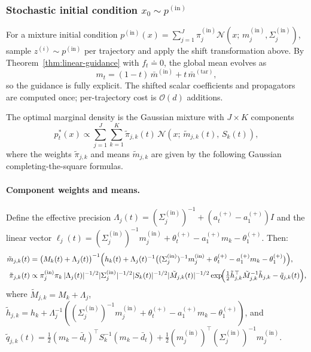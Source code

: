 \documentclass[11pt,onecolumn]{article}
\newcommand{\calN}{\mathcal{N}}
\newcommand{\pin}{p^{(\mathrm{in})}}
\begin{document}
\subsubsection{Stochastic initial condition $x_0\sim\pin$}
For a mixture initial condition
$\pin(x)=\sum_{j=1}^J\pi_j^{(\mathrm{in})}\calN(x;\,m_j^{(\mathrm{in})},\Sigma_j^{(\mathrm{in})})$,
sample $z^{(i)}\sim\pin$ per trajectory and apply the shift
transformation above.
By Theorem~\ref{thm:linear-guidance} with $f_t\doteq 0$, the global
mean evolves as
\begin{equation}
  m_t = (1-t)\,\bar m^{(\mathrm{in})} + t\,\bar m^{(\mathrm{tar})},
  \label{SI:eq:mt-gm-explicit}
\end{equation}
so the guidance is fully explicit.
The shifted scalar coefficients and propagators are computed once;
per-trajectory cost is $\mathcal{O}(d)$ additions.

The optimal marginal density is the Gaussian mixture with $J\times K$
components
\begin{equation}
  p_t^{*}(x) \propto
  \sum_{j=1}^J\sum_{k=1}^K \tilde\pi_{j,k}(t)\,
  \calN(x;\,\tilde m_{j,k}(t),\,S_k(t)),
  \label{SI:eq:p-star-mixture-to-mixture}
\end{equation}
where the weights $\tilde\pi_{j,k}$ and means $\tilde m_{j,k}$ are
given by the following Gaussian completing-the-square formulas.

\paragraph{Component weights and means.}
Define the effective precision
$\Lambda_j(t) = (\Sigma_j^{(\mathrm{in})})^{-1} + (a_t^{(+)}-a_1^{(+)})I$
and the linear vector
$\ell_j(t)
= (\Sigma_j^{(\mathrm{in})})^{-1}m_j^{(\mathrm{in})}
  + \theta_t^{(+)} - a_1^{(+)}m_k - \theta_1^{(+)}$.
Then:
\begin{align}
  \tilde m_{j,k}(t)
  &= \bigl(M_k(t)+\Lambda_j(t)\bigr)^{-1}
    \Bigl(h_k(t) + \Lambda_j(t)^{-1}
    \bigl((\Sigma_j^{(\mathrm{in})})^{-1}m_j^{(\mathrm{in})}
      + \theta_t^{(+)} - a_1^{(+)}m_k - \theta_1^{(+)}\bigr)\Bigr),
  \label{SI:eq:m-tilde}\\
  \tilde\pi_{j,k}(t)
  &\propto
    \pi_j^{(\mathrm{in})}\pi_k\,
    |\Lambda_j(t)|^{-1/2}|\Sigma_j^{(\mathrm{in})}|^{-1/2}
    |S_k(t)|^{-1/2}|\tilde M_{j,k}(t)|^{-1/2}
    \exp\!\Bigl(
      \tfrac{1}{2}\tilde h_{j,k}^\top\tilde M_{j,k}^{-1}\tilde h_{j,k}
      - \tilde q_{j,k}(t)
    \Bigr),
  \label{SI:eq:pi-tilde}
\end{align}
where
$\tilde M_{j,k}=M_k+\Lambda_j$,
$\tilde h_{j,k}
 = h_k + \Lambda_j^{-1}
   ((\Sigma_j^{(\mathrm{in})})^{-1}m_j^{(\mathrm{in})}
    +\theta_t^{(+)}-a_1^{(+)}m_k-\theta_1^{(+)})$,
and
$\tilde q_{j,k}(t)
 = \tfrac{1}{2}(m_k-\bar d_t)^\top S_k^{-1}(m_k-\bar d_t)
   + \tfrac{1}{2}(m_j^{(\mathrm{in})})^\top
     (\Sigma_j^{(\mathrm{in})})^{-1}m_j^{(\mathrm{in})}$.
\end{document}
